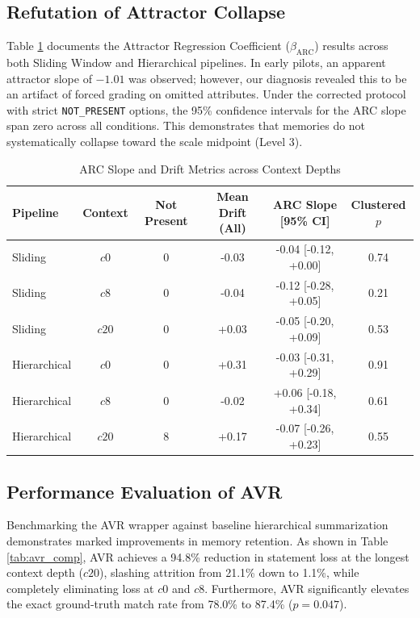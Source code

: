\documentclass[12pt,a4paper]{report}
\begin{document}
\subsection{Refutation of Attractor Collapse}
Table \ref{tab:arc_pilot} documents the Attractor Regression Coefficient ($\beta_{\text{ARC}}$) results across both Sliding Window and Hierarchical pipelines. In early pilots, an apparent attractor slope of $-1.01$ was observed; however, our diagnosis revealed this to be an artifact of forced grading on omitted attributes. Under the corrected protocol with strict \texttt{NOT\_PRESENT} options, the 95\% confidence intervals for the ARC slope span zero across all conditions. This demonstrates that memories do not systematically collapse toward the scale midpoint (Level 3).

\begin{table}[htbp]
\centering
\small
\caption{ARC Slope and Drift Metrics across Context Depths}
\label{tab:arc_pilot}
\begin{tabularx}{\textwidth}{lccccc}
\toprule
\textbf{Pipeline} & \textbf{Context} & \textbf{Not Present} & \textbf{Mean Drift (All)} & \textbf{ARC Slope [95\% CI]} & \textbf{Clustered $p$} \\
\midrule
Sliding & $c0$ & 0 & -0.03 & -0.04 [-0.12, +0.00] & 0.74 \\
Sliding & $c8$ & 0 & -0.04 & -0.12 [-0.28, +0.05] & 0.21 \\
Sliding & $c20$ & 0 & +0.03 & -0.05 [-0.20, +0.09] & 0.53 \\
Hierarchical & $c0$ & 0 & +0.31 & -0.03 [-0.31, +0.29] & 0.91 \\
Hierarchical & $c8$ & 0 & -0.02 & +0.06 [-0.18, +0.34] & 0.61 \\
Hierarchical & $c20$ & 8 & +0.17 & -0.07 [-0.26, +0.23] & 0.55 \\
\bottomrule
\end{tabularx}
\end{table}

\subsection{Performance Evaluation of AVR}
Benchmarking the AVR wrapper against baseline hierarchical summarization demonstrates marked improvements in memory retention. As shown in Table \ref{tab:avr_comp}, AVR achieves a 94.8\% reduction in statement loss at the longest context depth ($c20$), slashing attrition from 21.1\% down to 1.1\%, while completely eliminating loss at $c0$ and $c8$. Furthermore, AVR significantly elevates the exact ground-truth match rate from 78.0\% to 87.4\% ($p = 0.047$).
\end{document}
